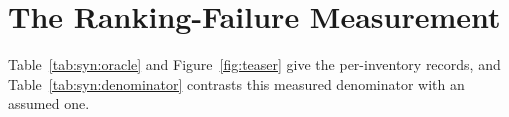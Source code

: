 \section{The Ranking-Failure Measurement}
\label{sec:syn:picture}

Table~\ref{tab:syn:oracle} and Figure~\ref{fig:teaser} give the per-inventory records, and Table~\ref{tab:syn:denominator} contrasts this measured denominator with an assumed one. %

